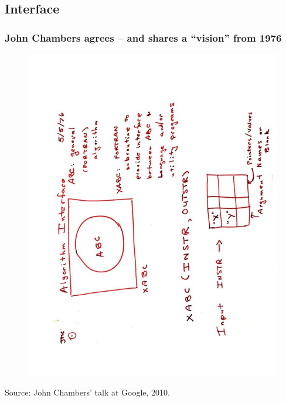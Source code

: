 \documentclass[dvipsnames,handout,compress,pdflatex,beamer]{beamer}
\begin{document}
\subsection{Interface}
\begin{frame}
  \frametitle{John Chambers agrees -- and shares a ``vision'' from 1976}

  \begin{figure}
    \includegraphics[scale=0.3,angle=270]{images/Chambers2010_Page6.pdf}
  \end{figure}

  \medskip \footnotesize Source: John Chambers' talk at Google, 2010.
\end{frame}
\end{document}
